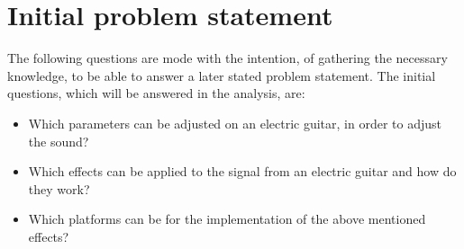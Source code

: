 
\section{Initial problem statement}
The following questions are mode with the intention, of gathering the necessary knowledge, to be able to answer  a later stated problem statement. The initial questions, which will be answered in the analysis, are:

\begin{itemize}
\item Which parameters can be adjusted on an electric guitar, in order to adjust the sound?
\item Which effects can be applied to the signal from an electric guitar and how do they work?
\item Which platforms can be for the implementation of the above mentioned effects? 
\end{itemize}